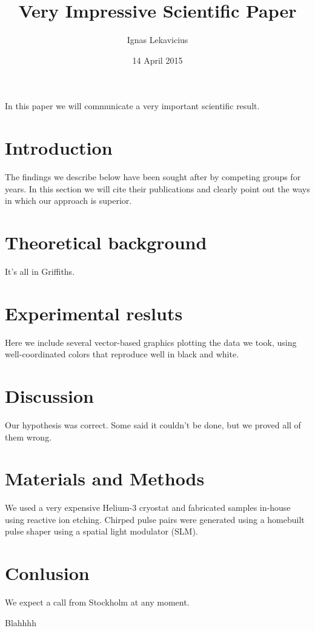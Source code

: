 \documentclass[11pt]{amsart}
\title{Very Impressive Scientific Paper}
\author{Ignas Lekavicius}
\date{14 April 2015}
\begin{document}
\maketitle

In this paper we will communicate a very important scientific result.

\section{Introduction}

The findings we describe below have been sought after by competing groups
 for years. In this section we will cite their publications and clearly
 point out the ways in which our approach is superior.

\section{Theoretical background}

It's all in Griffiths.

\section{Experimental resluts}

Here we include several vector-based graphics plotting the data we
 took, using well-coordinated colors that reproduce well in black and 
white.

\section{Discussion}

Our hypothesis was correct. Some said it couldn't be done, but we 
proved all of them wrong.

\section{Materials and Methods}

We used a very expensive Helium-3 cryostat and fabricated samples 
in-house using reactive ion etching. Chirped pulse pairs were
 generated using a homebuilt pulse shaper using a spatial light
 modulator (SLM).

\section{Conlusion}

We expect a call from Stockholm at any moment.

 Blahhhh
\end{document}
